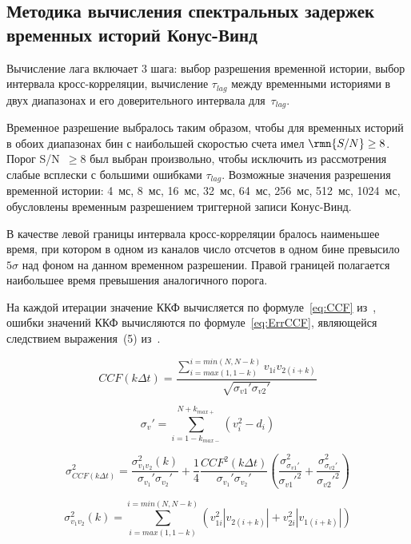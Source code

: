 \subsection{Методика вычисления спектральных задержек временных историй Конус-Винд}
Вычисление лага включает 3 шага: выбор разрешения временной истории, выбор интервала 
кросс-корреляции, вычисление $\tau_{lag}$ между временными историями в двух диапазонах 
и его доверительного интервала для~$\tau_{lag}$. 

Временное разрешение выбралось таким образом, чтобы для временных историй 
в обоих диапазонах бин с наибольшей скоростью счета имел $\rmn{S/N}\geq 8$. 
Порог S/N~$\geq 8$ был выбран произвольно, чтобы исключить из рассмотрения слабые 
всплески с большими ошибками $\tau_{lag}$. Возможные значения разрешения временной 
истории: 4~мс, 8~мс, 16~мс, 32~мс, 64~мс, 256~мс, 512~мс, 1024~мс, обусловлены 
временным разрешением триггерной записи Конус-Винд.

В качестве левой границы интервала кросс-корреляции бралось наименьшее время, 
при котором в одном из каналов число отсчетов в одном бине превысило $5\sigma$ 
над фоном на данном временном разрешении. Правой границей полагается наибольшее 
время превышения аналогичного порога. 

На каждой итерации значение ККФ вычисляется по формуле~\ref{eq:CCF} из~\citep{Band_1997}, 
ошибки значений ККФ вычисляются по формуле~\ref{eq:ErrCCF}, являющейся следствием выражения~(5) 
из~\citep{Fenimore_1995}.

\begin{equation}\label{eq:CCF}
CCF(k\Delta t) = \frac{\sum^{i=min(N, N-k)}_{i=max(1, 1-k)}v_{1i}v_{2(i+k)}}{\sqrt{\sigma_{v1}'\sigma_{v2}'}}
\end{equation}

\begin{equation}
\sigma_{v}' = \sum_{i=1-k_{max-}}^{N+k_{max+}}(v_i^2 -d_i)
\end{equation}

\begin{equation}\label{eq:ErrCCF}
\sigma_{CCF(k\Delta t)}^2 = \frac{\sigma_{v_1 v_2}^2(k)}{\sigma_{v_1}'\sigma_{v_2}'} 
+ \frac{1}{4}\frac{CCF^2(k\Delta t)}{\sigma_{v_1}'\sigma_{v_2}'}
\left( \frac{\sigma_{\sigma_{v1}'}^2}{\sigma_{v1}'^2} +\frac{\sigma_{\sigma_{v2}'}^2}{\sigma_{v2}'^2} \right)
\end{equation}

\begin{equation}
\sigma_{v_1 v_2}^2(k) = \sum^{i=min(N, N-k)}_{i=max(1, 1-k)} (v_{1i}^2 |v_{2(i+k)}| + v_{2i}^2 |v_{1(i+k)}|)
\end{equation}


